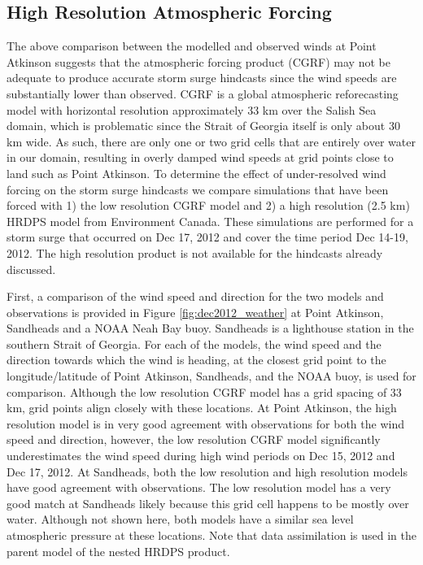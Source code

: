 \documentclass[letterpaper]{tATO2e}
\begin{document}
\subsection{High Resolution Atmospheric Forcing}\label{sec:res}
The above comparison between the modelled and observed winds at Point Atkinson suggests that the atmospheric forcing product (CGRF) may not be adequate to produce accurate storm surge hindcasts since the wind speeds are substantially lower than observed. CGRF is a global atmospheric reforecasting model with horizontal resolution approximately 33 km over the Salish Sea domain, which is problematic since the Strait of Georgia itself is only about 30 km wide. As such, there are only one or two grid cells that are entirely over water in our domain, resulting in overly damped wind speeds at grid points close to land such as Point Atkinson. To determine the effect of under-resolved wind forcing on the storm surge hindcasts we compare simulations that have been forced with 1) the low resolution CGRF model and 2) a high resolution (2.5 km) HRDPS model from Environment Canada.  These simulations are performed for a storm surge that occurred on Dec 17, 2012 and cover the time period Dec 14-19, 2012. The high resolution product is not available for the hindcasts already discussed. 

{\color{red} First, a comparison of the wind speed and direction for the two models and observations is provided in Figure \ref{fig:dec2012_weather} at Point Atkinson, Sandheads and a NOAA Neah Bay buoy.  Sandheads is a lighthouse station in the southern Strait of Georgia.} For each of the models, the wind speed and {\color{red} the direction towards which the wind is heading,} at the closest grid point to the longitude/latitude of Point Atkinson, Sandheads, and the NOAA buoy, is used for comparison. Although the low resolution CGRF model has a grid spacing of 33 km, grid points align closely with these locations. At Point Atkinson, the high resolution model is in very good agreement with observations for both the wind speed and direction, however, the low resolution CGRF model significantly underestimates the wind speed during high wind periods on Dec 15, 2012 and Dec 17, 2012. At Sandheads, both the low resolution and high resolution models have good agreement with observations. The low resolution model has a very good match at Sandheads likely because this grid cell happens to be mostly over water. Although not shown here, both models have a similar sea level atmospheric pressure at these locations. Note that data assimilation is used in the parent model of the nested HRDPS product.
\end{document}
